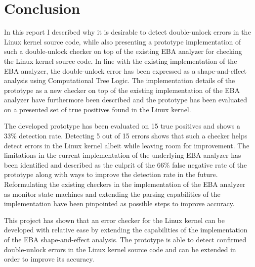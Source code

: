 \section{Conclusion}

In this report I described why it is desirable to detect double-unlock errors in the Linux kernel source code, while also presenting a prototype implementation of such a double-unlock checker on top of the existing EBA analyzer for checking the Linux kernel source code. In line with the existing implementation of the EBA analyzer, the double-unlock error has been expressed as a shape-and-effect analysis using Computational Tree Logic. The implementation details of the prototype as a new checker on top of the existing implementation of the EBA analyzer have furthermore been described and the prototype has been evaluated on a presented set of true positives found in the Linux kernel.

\newpar The developed prototype has been evaluated on 15 true positives and shows a 33\% detection rate. Detecting 5 out of 15 errors shows that such a checker helps detect errors in the Linux kernel albeit while leaving room for improvement. The limitations in the current implementation of the underlying EBA analyzer has been identified and described as the culprit of the 66\% false negative rate of the prototype along with ways to improve the detection rate in the future. Reformulating the existing checkers in the implementation of the EBA analyzer as monitor state machines and extending the parsing capabilities of the implementation have been pinpointed as possible steps to improve accuracy.

\newpar This project has shown that an error checker for the Linux kernel can be developed with relative ease by extending the capabilities of the implementation of the EBA shape-and-effect analysis. The prototype is able to detect confirmed double-unlock errors in the Linux kernel source code and can be extended in order to improve its accuracy.